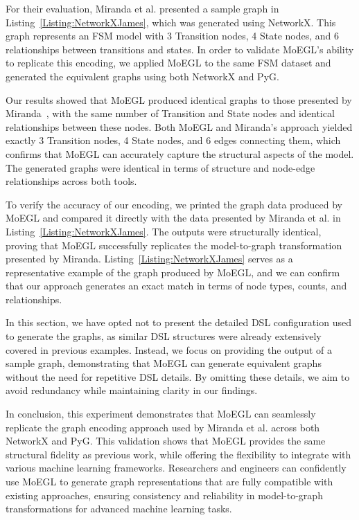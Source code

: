 \documentclass[journal,article,submit,moreauthors,technologies]{Definitions/mdpi}
\begin{document}
For their evaluation, Miranda et al. presented a sample graph in Listing~\ref{Listing:NetworkXJames}, which was generated using NetworkX. This graph represents an FSM model with 3 Transition nodes, 4 State nodes, and 6 relationships between transitions and states. In order to validate MoEGL's ability to replicate this encoding, we applied MoEGL to the same FSM dataset and generated the equivalent graphs using both NetworkX and PyG.

Our results showed that MoEGL produced identical graphs to those presented by Miranda~\cite{miranda2024towards}, with the same number of Transition and State nodes and identical relationships between these nodes. Both MoEGL and Miranda's approach yielded exactly 3 Transition nodes, 4 State nodes, and 6 edges connecting them, which confirms that MoEGL can accurately capture the structural aspects of the model. The generated graphs were identical in terms of structure and node-edge relationships across both tools.

To verify the accuracy of our encoding, we printed the graph data produced by MoEGL and compared it directly with the data presented by Miranda et al. in Listing~\ref{Listing:NetworkXJames}. The outputs were structurally identical, proving that MoEGL successfully replicates the model-to-graph transformation presented by Miranda. Listing~\ref{Listing:NetworkXJames} serves as a representative example of the graph produced by MoEGL, and we can confirm that our approach generates an exact match in terms of node types, counts, and relationships.

In this section, we have opted not to present the detailed DSL configuration used to generate the graphs, as similar DSL structures were already extensively covered in previous examples. Instead, we focus on providing the output of a sample graph, demonstrating that MoEGL can generate equivalent graphs without the need for repetitive DSL details. By omitting these details, we aim to avoid redundancy while maintaining clarity in our findings.

In conclusion, this experiment demonstrates that MoEGL can seamlessly replicate the graph encoding approach used by Miranda et al. across both NetworkX and PyG. This validation shows that MoEGL provides the same structural fidelity as previous work, while offering the flexibility to integrate with various machine learning frameworks. Researchers and engineers can confidently use MoEGL to generate graph representations that are fully compatible with existing approaches, ensuring consistency and reliability in model-to-graph transformations for advanced machine learning tasks.
\end{document}
